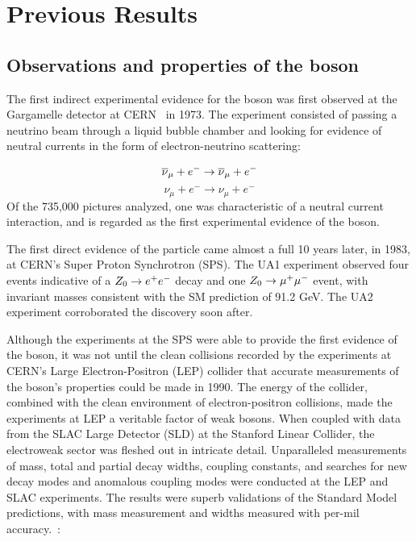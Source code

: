 \chapter{Previous Results}
\label{chapter:previous}

\section{Observations and properties of the \Z boson}
The first indirect experimental evidence for the \Z boson was first observed at the
Gargamelle detector at CERN~\cite{Hasert:1973uq} in 1973. The experiment
consisted of passing a neutrino beam through a liquid bubble chamber and looking
for evidence of neutral currents in the form of electron-neutrino scattering:

\begin{equation*}
\overline{\nu}_{\mu} + e^- \rightarrow \overline{\nu}_{\mu} +  e^- \newline
\end{equation*}
\begin{equation*}
\nu_{\mu} +  e^- \rightarrow \nu_{\mu} +  e^-
\end{equation*}
Of the 735,000 pictures analyzed, one was characteristic of a neutral current
interaction, and is regarded as the first experimental evidence of the \Z boson.

The first direct evidence of the particle came almost a full 10 years later, in
1983, at CERN's Super Proton Synchrotron (SPS). The UA1 experiment observed four
events indicative of a ${Z}_0\rightarrow e^+e^-$ decay and one ${Z}_0\rightarrow
\mu^+\mu^-$ event, with invariant masses consistent with the SM prediction of
91.2 GeV\cite{UA1:Zobs}. The UA2 experiment corroborated the discovery soon
after.

Although the experiments at the SPS were able to provide the first evidence of
the \Z boson, it was not until the clean collisions recorded by the experiments
at CERN's Large Electron-Positron (LEP) collider that accurate measurements of
the boson's properties could be made in 1990. The energy of the collider, combined with
the clean environment of electron-positron collisions, made the experiments at
LEP a veritable factor of weak bosons. When coupled with data from the SLAC
Large Detector (SLD) at the Stanford Linear Collider, the electroweak sector was
fleshed out in intricate detail.  Unparalleled measurements of mass, total and
partial decay widths, coupling constants, and searches for new decay modes and
anomalous coupling modes were conducted at the LEP and SLAC experiments. The
results were superb validations of the Standard Model predictions, with mass
measurement and widths measured with per-mil accuracy.~\cite{lepSLD:zPhys}:

